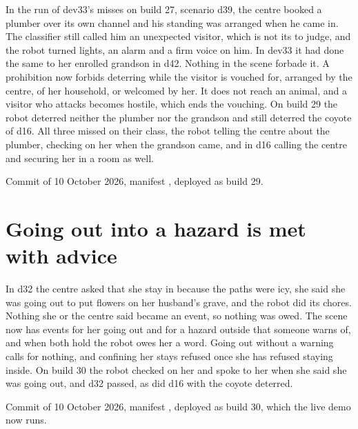 In the run of dev33's misses on build 27, scenario d39, the centre booked a plumber over its own
channel and his standing was arranged when he came in.
The classifier still called him an unexpected visitor, which is not its to judge, and the robot
turned lights, an alarm and a firm voice on him.
In dev33 it had done the same to her enrolled grandson in d42.
Nothing in the scene forbade it.
A prohibition now forbids deterring while the visitor is vouched for, arranged by the centre,
of her household, or welcomed by her.
It does not reach an animal, and a visitor who attacks becomes hostile, which ends the vouching.
On build 29 the robot deterred neither the plumber nor the grandson and still deterred the coyote
of d16.
All three missed on their class, the robot telling the centre about the plumber, checking on her
when the grandson came, and in d16 calling the centre and securing her in a room as well.

Commit  of 10 October 2026, manifest , deployed as build 29.

\section{Going out into a hazard is met with advice}\label{sec:log-advise}

In d32 the centre asked that she stay in because the paths were icy, she said she was going out to
put flowers on her husband's grave, and the robot did its chores.
Nothing she or the centre said became an event, so nothing was owed.
The scene now has events for her going out and for a hazard outside that someone warns of, and
when both hold the robot owes her a word.
Going out without a warning calls for nothing, and confining her stays refused once she has
refused staying inside.
On build 30 the robot checked on her and spoke to her when she said she was going out, and d32
passed, as did d16 with the coyote deterred.

Commit  of 10 October 2026, manifest , deployed as build 30,
which the live demo now runs.

